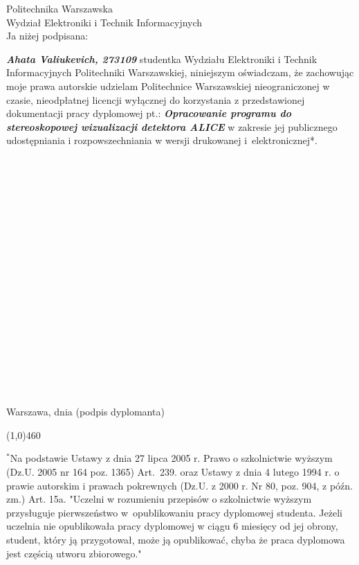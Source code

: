 \newpage
\thispagestyle{empty}
\phantom{Nothing here}
\newpage
\clearpage
\phantom{Here neither}

\setcounter{page}{9}
\vspace{-1.5cm}
\begin{flushleft}
	Politechnika Warszawska \\ 
	Wydział Elektroniki i Technik Informacyjnych  \\
	\vspace{0.5cm}
	Ja niżej podpisana: 
\end{flushleft}
\center \textit{\textbf{Ahata Valiukevich, 273109}} %
\justify studentka Wydziału Elektroniki i Technik Informacyjnych Politechniki Warszawskiej, niniejszym oświadczam, że zachowując moje prawa autorskie udzielam Politechnice Warszawskiej nieograniczonej w czasie, nieodpłatnej licencji wyłącznej do korzystania z przedstawionej dokumentacji pracy dyplomowej pt.:
\center \textit{\textbf{ Opracowanie programu do stereoskopowej wizualizacji detektora ALICE}} 
\justify w zakresie jej publicznego udostępniania i rozpowszechniania w wersji drukowanej i~elektronicznej*.
\\~\\~\\~\\~\\~\\~\\~\\~\\~\\~\\~\\~\\~\\~\\~\\~\\~\\~\\~\\
Warszawa, dnia  \hfill (podpis dyplomanta) 

\begin{center}
	\color{sapphire}
	\line(1,0){460}
\end{center}
\footnotesize \noindent $^{*}$Na podstawie Ustawy z dnia 27 lipca 2005 r. Prawo o szkolnictwie wyższym (Dz.U. 2005 nr 164 poz. 1365) Art.~239. oraz Ustawy z dnia 4 lutego 1994 r. o prawie autorskim i prawach pokrewnych (Dz.U. z 2000 r. Nr 80, poz. 904, z późn. zm.) Art. 15a. "Uczelni w rozumieniu przepisów o szkolnictwie wyższym przysługuje pierwszeństwo w~opublikowaniu pracy dyplomowej studenta. Jeżeli uczelnia nie opublikowała pracy dyplomowej w ciągu 6 miesięcy od jej obrony, student, który ją przygotował, może ją opublikować, chyba że praca dyplomowa jest częścią utworu zbiorowego."

\newpage
\thispagestyle{empty}
\phantom{Nothing here}

